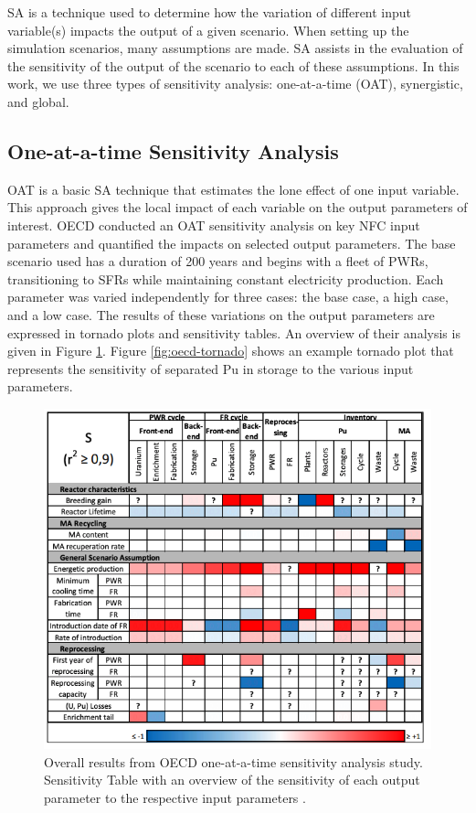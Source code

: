 \gls{SA} is a technique used to determine how the variation of 
different input variable(s) impacts the output of a given 
scenario. 
When setting up the simulation scenarios, many assumptions are made. 
\gls{SA} assists in the evaluation of the sensitivity of the 
output of the scenario to each of these assumptions. 
In this work, we use three types of sensitivity analysis: 
one-at-a-time (OAT), synergistic, and global.

\subsection{One-at-a-time Sensitivity Analysis}
OAT is a basic \gls{SA} technique that estimates 
the lone effect of one input variable. 
This approach gives the local impact of each variable on the 
output parameters of interest. 
OECD conducted an OAT sensitivity analysis \cite{noauthor_effects_2017} 
on key \gls{NFC} input parameters
and quantified the impacts on selected output parameters. 
The base scenario used has a duration of 200 years and begins 
with a fleet of \glspl{PWR}, transitioning to \glspl{SFR} while 
maintaining constant electricity production. 
Each parameter was varied independently for three cases: 
the base case, a high case, and a low case. 
The results of these variations on the output parameters 
are expressed in tornado plots and sensitivity tables. 
An overview of their analysis is given in 
Figure \ref{fig:oecd-sensitivitytable}. 
Figure \ref{fig:oecd-tornado} shows an example tornado plot that represents 
the sensitivity of separated Pu in storage to the various input parameters. 

\begin{figure}[]
	\begin{center}
		\includegraphics[scale=0.6]{./figures/oecd-sensitivitytable.png}
	\end{center}	
        \caption{Overall results from OECD one-at-a-time sensitivity analysis 
        study. Sensitivity Table with an overview of the sensitivity 
		of each output parameter to the respective input parameters \cite{noauthor_effects_2017}.}
	\label{fig:oecd-sensitivitytable}
\end{figure}


